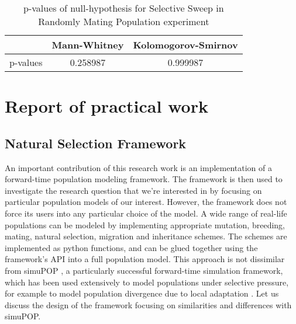 \documentclass{l4proj}
\newif\ifdebug
\begin{document}
\begin{table}[]
    \centering
    \begin{tabular}{|c|c|c|}
    \hline
    & Mann-Whitney & Kolomogorov-Smirnov \\ \hline
    p-values & 0.258987 & 0.999987 \\ \hline
    \end{tabular}
    \caption{p-values of null-hypothesis for Selective Sweep in Randomly Mating Population experiment}
    \label{nullHypothesisTable}
\end{table}


\chapter{Report of practical work}\label{practical}
\ifdebug
This section should summarize the practical work done and its results, concentrating on any unusual or original features. Enough detail should be included to assure the reader that the work has been professionally and competently done, and that the results are trustworthy. Any design features, algorithms and data structures of special interest should be described. Documentation to full software engineering standards is not required.
\fi

\section{Natural Selection Framework}
An important contribution of this research work is an implementation of a forward-time population modeling framework. The framework is then used to investigate the research question that we're interested in by focusing on particular population models of our interest. However, the framework does not force its users into any particular choice of the model. A wide range of real-life populations can be modeled by implementing appropriate mutation, breeding, mating, natural selection, migration and inheritance schemes. The schemes are implemented as python functions, and can be glued together using the framework's API into a full population model. This approach is not dissimilar from simuPOP \parencite{peng05}, a particularly successful forward-time simulation framework, which has been used extensively to model populations under selective pressure, for example to model population divergence due to local adaptation \parencite{naturalSelectionSignatures16}. Let us discuss the design of the framework focusing on similarities and differences with simuPOP.
\end{document}
